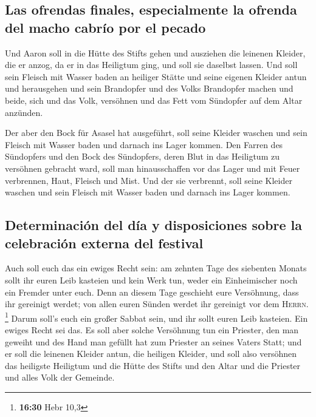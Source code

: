 \hypertarget{las-ofrendas-finales-especialmente-la-ofrenda-del-macho-cabruxedo-por-el-pecado}{%
\subsection{Las ofrendas finales, especialmente la ofrenda del macho
cabrío por el
pecado}\label{las-ofrendas-finales-especialmente-la-ofrenda-del-macho-cabruxedo-por-el-pecado}}

 Und Aaron soll in die Hütte des Stifts gehen und
ausziehen die leinenen Kleider, die er anzog, da er in das Heiligtum
ging, und soll sie daselbst lassen.  Und soll sein
Fleisch mit Wasser baden an heiliger Stätte und seine eigenen Kleider
antun und herausgehen und sein Brandopfer und des Volks Brandopfer
machen und beide, sich und das Volk, versöhnen  und das
Fett vom Sündopfer auf dem Altar anzünden.

 Der aber den Bock für Asasel hat ausgeführt, soll seine
Kleider waschen und sein Fleisch mit Wasser baden und darnach ins Lager
kommen.  Den Farren des Sündopfers und den Bock des
Sündopfers, deren Blut in das Heiligtum zu versöhnen gebracht ward, soll
man hinausschaffen vor das Lager und mit Feuer verbrennen, Haut, Fleisch
und Mist.  Und der sie verbrennt, soll seine Kleider
waschen und sein Fleisch mit Wasser baden und darnach ins Lager kommen.

\hypertarget{determinaciuxf3n-del-duxeda-y-disposiciones-sobre-la-celebraciuxf3n-externa-del-festival}{%
\subsection{Determinación del día y disposiciones sobre la celebración
externa del
festival}\label{determinaciuxf3n-del-duxeda-y-disposiciones-sobre-la-celebraciuxf3n-externa-del-festival}}

 Auch soll euch das ein ewiges Recht sein: am zehnten
Tage des siebenten Monats sollt ihr euren Leib kasteien und kein Werk
tun, weder ein Einheimischer noch ein Fremder unter euch.
 Denn an diesem Tage geschieht eure Versöhnung, dass ihr
gereinigt werdet; von allen euren Sünden werdet ihr gereinigt vor dem
\textsc{Herrn}. \footnote{\textbf{16:30} Hebr 10,3} 
Darum soll's euch ein großer Sabbat sein, und ihr sollt euren Leib
kasteien. Ein ewiges Recht sei das.  Es soll aber solche
Versöhnung tun ein Priester, den man geweiht und des Hand man gefüllt
hat zum Priester an seines Vaters Statt; und er soll die leinenen
Kleider antun, die heiligen Kleider,  und soll also
versöhnen das heiligste Heiligtum und die Hütte des Stifts und den Altar
und die Priester und alles Volk der Gemeinde.

